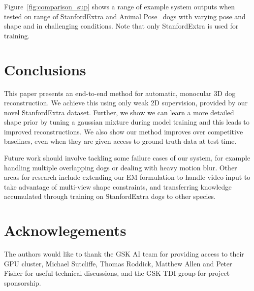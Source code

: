 Figure~\ref{fig:comparison_sup} shows a range of example system outputs when tested on range of StanfordExtra and Animal Pose~\cite{animalpose} dogs with varying pose and shape and in challenging conditions. Note that only StanfordExtra is used for training.


% 

% 

% 

\section{Conclusions}
This paper presents an end-to-end method for automatic, monocular 3D dog reconstruction. We achieve this using only weak 2D supervision, provided by our novel StanfordExtra dataset. Further, we show we can learn a more detailed shape prior by tuning a gaussian mixture during model training and this leads to improved reconstructions. We also show our method improves over competitive baselines, even when they are given access to ground truth data at test time.

Future work should involve tackling some failure cases of our system, for example handling multiple overlapping dogs or dealing with heavy motion blur. Other areas for research include extending our EM formulation to handle video input to take advantage of multi-view shape constraints, and transferring knowledge accumulated through training on StanfordExtra dogs to other species.

\section{Acknowlegements}
The authors would like to thank the GSK AI team for providing access to their GPU cluster, Michael Sutcliffe, Thomas Roddick, Matthew Allen and Peter Fisher for useful technical discussions, and the GSK TDI group for project sponsorship. 

